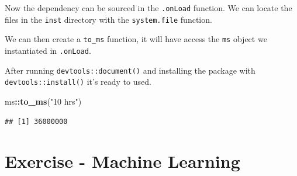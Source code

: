 \documentclass[
]{krantz}
\makeatletter
\newenvironment{Shaded}{\begin{snugshade}}{\end{snugshade}}
\newcommand{\CommentTok}[1]{\textcolor[rgb]{0.37,0.37,0.37}{\textit{#1}}}
\newcommand{\ControlFlowTok}[1]{\textcolor[rgb]{0.27,0.27,0.27}{\textbf{#1}}}
\newcommand{\DataTypeTok}[1]{\textcolor[rgb]{0.27,0.27,0.27}{#1}}
\newcommand{\KeywordTok}[1]{\textcolor[rgb]{0.27,0.27,0.27}{\textbf{#1}}}
\newcommand{\NormalTok}[1]{#1}
\newcommand{\OperatorTok}[1]{\textcolor[rgb]{0.43,0.43,0.43}{\textbf{#1}}}
\newcommand{\OtherTok}[1]{\textcolor[rgb]{0.37,0.37,0.37}{#1}}
\newcommand{\StringTok}[1]{\textcolor[rgb]{0.5,0.5,0.5}{#1}}
\newenvironment{kframe}{%
\medskip{}
\setlength{\fboxsep}{.8em}
 \def\at@end@of@kframe{}%
 \ifinner\ifhmode%
  \def\at@end@of@kframe{\end{minipage}}%
  \begin{minipage}{\columnwidth}%
 \fi\fi%
 \def\FrameCommand##1{\hskip\@totalleftmargin \hskip-\fboxsep
 \colorbox{shadecolor}{##1}\hskip-\fboxsep
     \hskip-\linewidth \hskip-\@totalleftmargin \hskip\columnwidth}%
 \MakeFramed {\advance\hsize-\width
   \@totalleftmargin\z@ \linewidth\hsize
   \@setminipage}}%
 {\par\unskip\endMakeFramed%
 \at@end@of@kframe}
\renewenvironment{Shaded}{\begin{kframe}}{\end{kframe}}
\makeatother
\begin{document}
Now the dependency can be sourced in the \texttt{.onLoad} function. We can locate the files in the \texttt{inst} directory with the \texttt{system.file} function.

\begin{Shaded}
\end{Shaded}

We can then create a \texttt{to\_ms} function, it will have access the \texttt{ms} object we instantiated in \texttt{.onLoad}.

\begin{Shaded}
\end{Shaded}

After running \texttt{devtools::document()} and installing the package with \texttt{devtools::install()} it's ready to used.

\begin{Shaded}
\begin{Highlighting}[]
\NormalTok{ms}\OperatorTok{::}\KeywordTok{to\_ms}\NormalTok{(}\StringTok{"10 hrs"}\NormalTok{)}
\end{Highlighting}
\end{Shaded}

\begin{verbatim}
## [1] 36000000
\end{verbatim}

\hypertarget{v8-ml}{%
\chapter{Exercise - Machine Learning}\label{v8-ml}}
\end{document}
